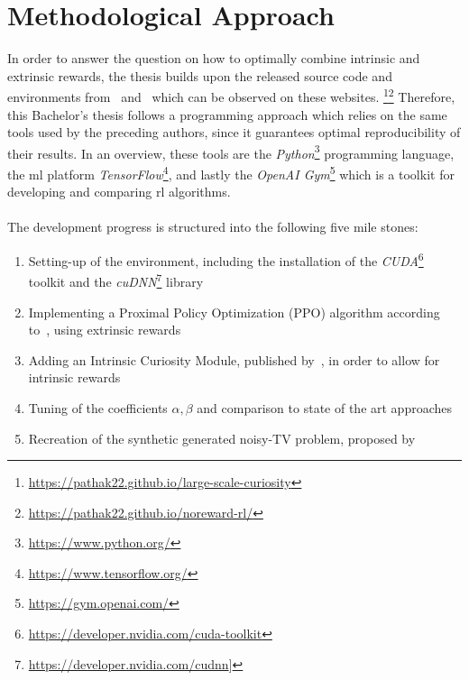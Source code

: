 \documentclass[draft,final]{vutinfth} %
\begin{document}
    \section{Methodological Approach}\label{sec:methodological-approach}
    In order to answer the question on how to optimally combine intrinsic and extrinsic rewards, the thesis builds upon the released source code and environments from~\cite{burda_large-scale_2018-1} and~\cite{pathak_curiosity-driven_2017-1} which can be observed on these websites. \footnote{\url{https://pathak22.github.io/large-scale-curiosity}}\footnote{\url{https://pathak22.github.io/noreward-rl/}}
    Therefore, this Bachelor's thesis follows a programming approach which relies on the same tools used by the preceding authors, since it guarantees optimal reproducibility of their results.
    In an overview, these tools are the \textit{Python}\footnote{\url{https://www.python.org/}} programming language, the \gls{ml} platform \textit{TensorFlow}\footnote{\url{https://www.tensorflow.org/}}, and lastly the \textit{OpenAI Gym}\footnote{\url{https://gym.openai.com/}} which is a toolkit for developing and comparing \gls{rl} algorithms.
    \\\\
    The development progress is structured into the following five mile stones:

    \begin{enumerate}
        \item Setting-up of the environment, including the installation of the \textit{CUDA}\footnote{\url{https://developer.nvidia.com/cuda-toolkit}} toolkit and the \textit{cuDNN}\footnote{\url{https://developer.nvidia.com/cudnn}]} library
        \item Implementing a Proximal Policy Optimization (PPO) algorithm according to~\cite{schulman_proximal_2017}, using extrinsic rewards
        \item Adding an Intrinsic Curiosity Module, published by~\cite{pathak_curiosity-driven_2017-1}, in order to allow for intrinsic rewards
        \item Tuning of the coefficients $\alpha,\beta$ and comparison to state of the art approaches
        \item Recreation of the synthetic generated noisy-TV problem, proposed by~\cite{burda_large-scale_2018-1}
    \end{enumerate}
\end{document}
